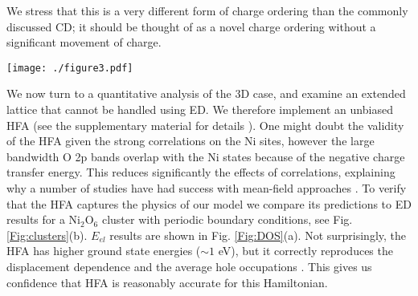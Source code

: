 \documentclass[showpacs,preprintnumbers,amsmath,amssymb,prl,aps,twocolumn,superscriptaddress]{revtex4}
\begin{document}
We stress that
this is a very different form of charge ordering than the commonly
discussed CD; it should be thought of as a novel charge ordering
without a significant movement of charge.


\begin{figure*}[ht]
 \texttt{[image: ./figure3.pdf]}
 \caption{\label{Fig:DOS} (color online) (a) A comparison of the
   dependence of the HFA (red/light) and ED (black/dark) ground state
   energies of the Ni$_2$O$_6$ cluster as a function of the oxygen
   displacement.  (b)-(e) HFA results for the 3D lattice with
   $80\times80\times80/2$ momentum points in the Brillouin zone:
   (b) ground state electronic energy, (c) average hole occupation of the oxygen
   (blue) sites and the compressed/expanded Ni sites (black/red), (d)
   magnetization $m_z = (n_\uparrow-n_\downarrow)$ of the Ni orbitals,
   (e) single particle density of states for several oxygen
   displacements.  The spectrum has been lifetime broadened with a
   Lorentzian (HFHM $=$ 25 meV). Another band of states is located
   below 3 eV (not shown). The inset shows the gap as a function of
   displacement. 
}
\end{figure*}


We now turn to a  quantitative analysis of the 3D case, and
examine an extended lattice that cannot be handled using 
ED. We therefore implement an unbiased HFA \cite{MeanField}
(see the supplementary material for details
\cite{Supplement}). One might doubt the validity of the HFA
given the strong correlations on the Ni sites, however the large bandwidth O 2p
bands overlap with the Ni states
because of the negative charge transfer energy. This reduces significantly the
effects of correlations, explaining why a number of studies have had
success with mean-field approaches
\cite{MizokawaPRB1995,MizokawaPRB2000,LauPRL2013}.  To verify that the HFA  
captures the physics of our model we compare its predictions to ED results for
a Ni$_2$O$_6$ cluster with periodic boundary
conditions, see Fig.  \ref{Fig:clusters}(b). $E_{el}$ results are shown in
Fig. \ref{Fig:DOS}(a). Not surprisingly, the HFA has higher 
ground state energies ($\sim 1$ eV), but it correctly reproduces the
displacement dependence and the average hole occupations 
\cite{Supplement}. This gives us confidence that HFA 
is reasonably accurate for this Hamiltonian.
\end{document}
